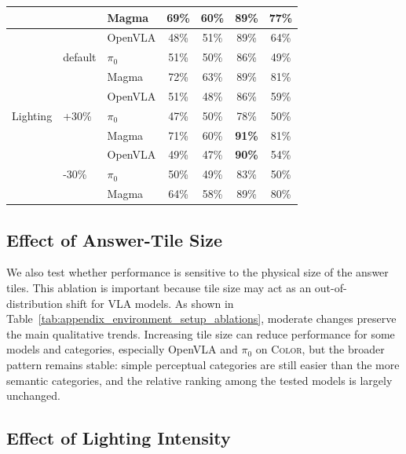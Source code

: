 \documentclass[11pt]{article}
\newcommand{\heatDG}[1]{\cellcolor{mydarkgreen}\textbf{#1}}
\newcommand{\heatG}[1]{\cellcolor{mygreen}#1}
\newcommand{\heatLG}[1]{\cellcolor{mylightgreen}#1}
\newcommand{\heatO}[1]{\cellcolor{myorange}#1}
\begin{document}
\begin{table}[t]
{\begin{tabular}{lllcccc}
& & Magma & \heatG{69\%} & \heatG{60\%} & \heatG{89\%} & \heatG{77\%} \\
\midrule
\multirow{9}{*}{Lighting}
& \multirow{3}{*}{default}
& OpenVLA & \heatO{48\%} & \heatO{51\%} & \heatG{89\%} & \heatG{64\%} \\
& & $\pi_0$ & \heatO{51\%} & \heatO{50\%} & \heatG{86\%} & \heatO{49\%} \\
& & Magma & \heatG{72\%} & \heatG{63\%} & \heatG{89\%} & \heatG{81\%} \\
\cmidrule(lr){2-7}
& \multirow{3}{*}{+30\%}
& OpenVLA & \heatO{51\%} & \heatO{48\%} & \heatG{86\%} & \heatLG{59\%} \\
& & $\pi_0$ & \heatO{47\%} & \heatO{50\%} & \heatG{78\%} & \heatO{50\%} \\
& & Magma & \heatG{71\%} & \heatG{60\%} & \heatDG{91\%} & \heatG{81\%} \\
\cmidrule(lr){2-7}
& \multirow{3}{*}{-30\%}
& OpenVLA & \heatO{49\%} & \heatO{47\%} & \heatDG{90\%} & \heatLG{54\%} \\
& & $\pi_0$ & \heatO{50\%} & \heatO{49\%} & \heatG{83\%} & \heatO{50\%} \\
& & Magma & \heatG{64\%} & \heatLG{58\%} & \heatG{89\%} & \heatG{80\%} \\
\bottomrule
\end{tabular}
}
\end{table}

\subsection{Effect of Answer-Tile Size}

We also test whether performance is sensitive to the physical size of the answer tiles.
This ablation is important because tile size may act as an out-of-distribution shift for VLA models.
As shown in Table~\ref{tab:appendix_environment_setup_ablations}, moderate changes preserve the main qualitative trends.
Increasing tile size can reduce performance for some models and categories, especially OpenVLA and $\pi_0$ on \textsc{Color}, but the broader pattern remains stable: simple perceptual categories are still easier than the more semantic categories, and the relative ranking among the tested models is largely unchanged.

\subsection{Effect of Lighting Intensity}
\end{document}
